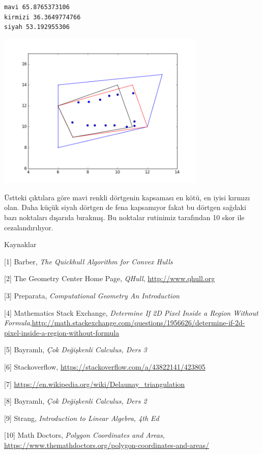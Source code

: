 \documentclass[12pt,fleqn]{article}\usepackage{../../common}
\begin{document}
\begin{verbatim}
mavi 65.8765373106
kirmizi 36.3649774766
siyah 53.192955306
\end{verbatim}

\includegraphics[width=10cm]{enc_11.png}

Üstteki çıktılara göre mavi renkli dörtgenin kapsaması en kötü, en iyisi
kırmızı olan. Daha küçük siyah dörtgen de fena kapsamıyor fakat bu dörtgen
sağdaki bazı noktaları dışarıda bırakmış. Bu noktalar rutinimiz tarafından
10 skor ile cezalandırılıyor.

Kaynaklar 

[1] Barber, {\em The Quickhull Algorithm for Convex Hulls}

[2] The Geometry Center Home Page, {\em QHull}, \url{http://www.qhull.org}

[3] Preparata, {\em Computational Geometry An Introduction}

[4] Mathematics Stack Exchange, {\em Determine If 2D Pixel Inside a Region Without Formula},\url{http://math.stackexchange.com/questions/1956626/determine-if-2d-pixel-inside-a-region-without-formula}

[5] Bayramlı, {\em Çok Değişkenli Calculus, Ders 3}

[6] Stackoverflow, \url{https://stackoverflow.com/a/43822141/423805}

[7] \url{https://en.wikipedia.org/wiki/Delaunay_triangulation}

[8] Bayramlı, {\em Çok Değişkenli Calculus, Ders 2}

[9] Strang, {\em Introduction to Linear Algebra, 4th Ed}

[10] Math Doctors, {\em Polygon Coordinates and Areas},
     \url{https://www.themathdoctors.org/polygon-coordinates-and-areas/}
\end{document}
